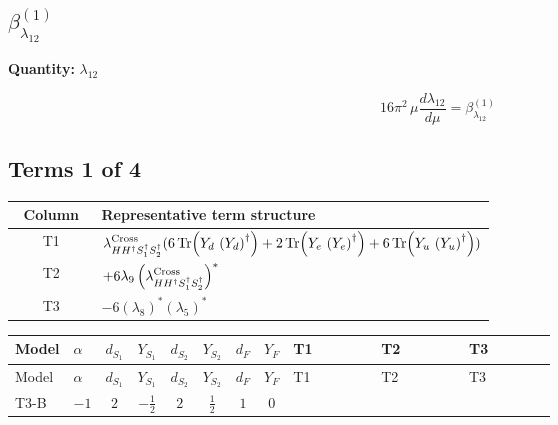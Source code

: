 \documentclass[8pt]{article}
\begin{document}
\begin{landscape}
\section*{$\beta_{\lambda_{12}}^{(1)}$}
\noindent\textbf{Quantity: }$\lambda_{12}$\par\smallskip
\[16\pi^2\,\mu\frac{d \lambda_{12}}{d\mu}=\beta_{\lambda_{12}}^{(1)}\]
\subsection*{Terms 1 of 4}
\begin{center}
\begin{tabular}{@{}c >{\raggedright\arraybackslash}p{0.82\linewidth}@{}}
\toprule
Column & Representative term structure \\
\midrule
T1 & \(\displaystyle {\lambda_{H H^\dagger S_1^\dagger S_2^\dagger}^{\rm Cross}} (6 \operatorname{Tr}\!\left({Y_d}\,\left({Y_d}\right)^{\dagger}\right)+2 \operatorname{Tr}\!\left({Y_e}\,\left({Y_e}\right)^{\dagger}\right)+6 \operatorname{Tr}\!\left({Y_u}\,\left({Y_u}\right)^{\dagger}\right))\) \\
\midrule
T2 & \(\displaystyle +6 {\lambda_9} \left({\lambda_{H H^\dagger S_1^\dagger S_2^\dagger}^{\rm Cross}}\right)^{*}\) \\
\midrule
T3 & \(\displaystyle -6 \left({\lambda_8}\right)^{*} \left({\lambda_5}\right)^{*}\) \\
\midrule
\bottomrule
\end{tabular}
\end{center}
\smallskip
\tiny
\begin{longtable}{@{}llcccccc >{\raggedright\arraybackslash}p{0.21\linewidth} >{\raggedright\arraybackslash}p{0.21\linewidth} >{\raggedright\arraybackslash}p{0.21\linewidth}@{}}
\toprule
Model & $\alpha$ & $d_{S_1}$ & $Y_{S_1}$ & $d_{S_2}$ & $Y_{S_2}$ & $d_F$ & $Y_F$ & T1 & T2 & T3 \\
\midrule
\endfirsthead
\toprule
Model & $\alpha$ & $d_{S_1}$ & $Y_{S_1}$ & $d_{S_2}$ & $Y_{S_2}$ & $d_F$ & $Y_F$ & T1 & T2 & T3 \\
\midrule
\endhead
T3-B & $-1$ & $2$ & $-\frac{1}{2}$ & $2$ & $\frac{1}{2}$ & $1$ & $0$ & \scriptsize\adjustbox{max width=\linewidth}{$\begin{gathered} {\lambda_{H H^\dagger S_1^\dagger S_2^\dagger}^{\rm Cross}} (6 \operatorname{Tr}\!\left({Y_d}\,\left({Y_d}\right)^{\dagger}\right)+2 \operatorname{Tr}\!\left({Y_e}\,\left({Y_e}\right)^{\dagger}\right)+6 \operatorname{Tr}\!\left({Y_u}\,\left({Y_u}\right)^{\dagger}\right))\end{gathered}$} & \scriptsize\adjustbox{max width=\linewidth}{$\begin{gathered} +6 {\lambda_9} \left({\lambda_{H H^\dagger S_1^\dagger S_2^\dagger}^{\rm Cross}}\right)^{*}\end{gathered}$} & \scriptsize\adjustbox{max width=\linewidth}{$\begin{gathered} -6 \left({\lambda_8}\right)^{*} \left({\lambda_5}\right)^{*}\end{gathered}$} \\

\end{longtable}
\end{landscape}
\end{document}
